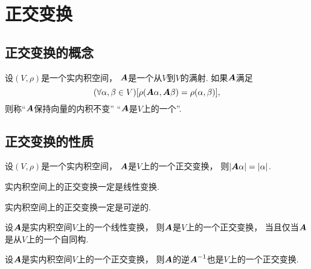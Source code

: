 \section{正交变换}
\subsection{正交变换的概念}
\begin{definition}
设\((V,\rho)\)是一个实内积空间，
\(\boldsymbol{A}\)是一个从\(V\)到\(V\)的满射.
如果\(\boldsymbol{A}\)满足\begin{equation}
	(\forall \alpha,\beta \in V)
	[
		\rho(\boldsymbol{A}\alpha,\boldsymbol{A}\beta)
		= \rho(\alpha,\beta)
	],
\end{equation}
则称“\(\boldsymbol{A}\)保持向量的内积不变”
“\(\boldsymbol{A}\)是\(V\)上的一个”.
\end{definition}

\subsection{正交变换的性质}
\begin{property}\label{theorem:正交变换.保长性1}
设\((V,\rho)\)是一个实内积空间，
\(\boldsymbol{A}\)是\(V\)上的一个正交变换，
则\(\abs{\boldsymbol{A}\alpha} = \abs{\alpha}\).
\end{property}

\begin{proposition}
实内积空间上的正交变换一定是线性变换.
\end{proposition}

\begin{proposition}
实内积空间上的正交变换一定是可逆的.
\end{proposition}

\begin{proposition}
设\(\boldsymbol{A}\)是实内积空间\(V\)上的一个线性变换，
则\(\boldsymbol{A}\)是\(V\)上的一个正交变换，
当且仅当\(\boldsymbol{A}\)是从\(V\)上的一个自同构.
\end{proposition}

\begin{proposition}
设\(\boldsymbol{A}\)是实内积空间\(V\)上的一个正交变换，
则\(\boldsymbol{A}\)的逆\(\boldsymbol{A}^{-1}\)也是\(V\)上的一个正交变换.
\end{proposition}

